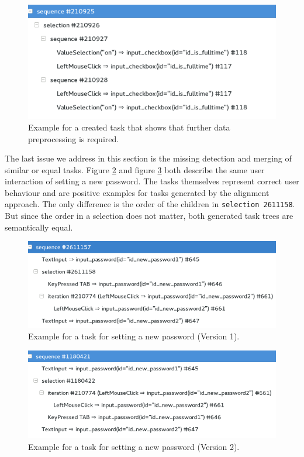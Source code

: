\begin{figure}[h]
	\centering
	\includegraphics[scale=0.75]{chapters/casestudy/preprocessing_needed.png}
	\caption{Example for a created task that shows that further data preprocessing is required.}
	\label{fig:preprocessing_needed}
\end{figure}
The last issue we address in this section is the missing detection and merging of similar or equal tasks.
Figure \ref{fig:newpassword} and figure \ref{fig:newpassword-1} both describe the same user interaction of setting a new password. 
The tasks themselves represent correct user behaviour and are positive examples for tasks generated by the alignment approach.
The only difference is the order of the children in \texttt{selection 2611158}. 
But since the order in a selection does not matter, both generated task trees are semantically equal.
\begin{figure}
	\centering
	\includegraphics[scale=0.75]{chapters/casestudy/newpassword.png}
	\caption{Example for a task for setting a new password (Version 1).}
	\label{fig:newpassword}
\end{figure}
\begin{figure}
	\centering
	\includegraphics[scale=0.75]{chapters/casestudy/newpassword-1.png}
	\caption{Example for a task for setting a new password (Version 2).}
	\label{fig:newpassword-1}
\end{figure}

